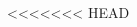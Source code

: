 \documentclass{../../oss-apphys-exam}
\begin{document}
\begin{multicols*}{2}
\begin{questions}
%
%    
<<<<<<< HEAD
    

\end{questions}
\end{multicols*}
\end{document}
